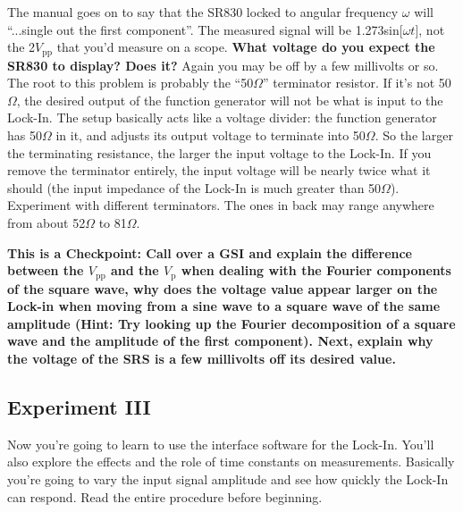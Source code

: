 \documentclass{../lab}
\begin{document}
The manual goes on to say that the SR830 locked to angular frequency $\omega$ will ``...single out the first component''. The measured signal will be 1.273sin[$\omega t$], not the 2$V_\text{pp}$ that you'd measure on a scope. \textbf{What voltage do you expect the SR830 to display? Does it?} Again you may be off by a few millivolts or so. The root to this problem is probably the ``50$\Omega$'' terminator resistor. If it's not 50$\Omega$, the desired output of the function generator will not be what is input to the Lock-In. The setup basically acts like a voltage divider: the function generator has 50$\Omega$ in it, and adjusts its output voltage to terminate into 50$\Omega$. So the larger the terminating resistance, the larger the input voltage to the Lock-In. If you remove the terminator entirely, the input voltage will be nearly twice what it should (the input impedance of the Lock-In is much greater than 50$\Omega$). Experiment with different terminators. The ones in back may range anywhere from about 52$\Omega$ to 81$\Omega$.


\textbf{This is a Checkpoint: Call over a GSI and explain the difference between the $V_\text{pp}$ and the $V_\text{p}$ when dealing with the Fourier components of the square wave, why does the voltage value appear larger on the Lock-in when moving from a sine wave to a square wave of the same amplitude (Hint: Try looking up the Fourier decomposition of a square wave and the amplitude of the first component). Next, explain why the voltage of the SRS is a few millivolts off its desired value. }

\subsection{Experiment III}

Now you're going to learn to use the interface software for the Lock-In. You'll also explore the effects and the role of time constants on measurements. Basically you're going to vary the input signal amplitude and see how quickly the Lock-In can respond. Read the entire procedure before beginning.
\end{document}
